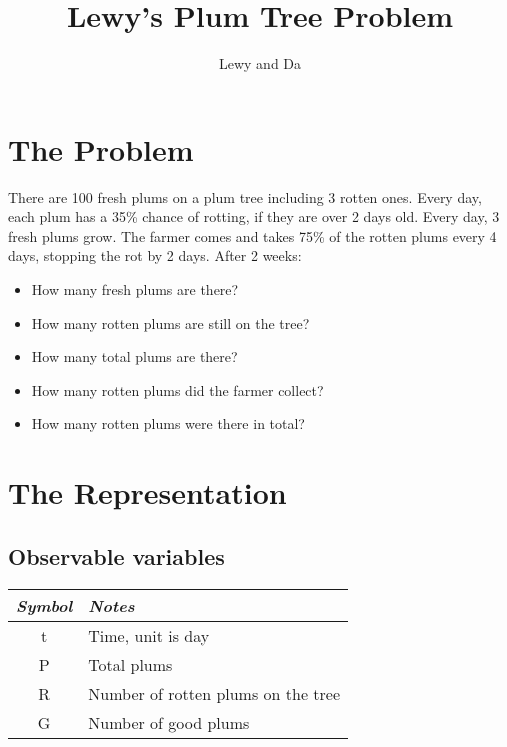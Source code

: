\documentclass[11pt, oneside]{article}   	%
\title{Lewy's Plum Tree Problem}
\author{Lewy and Da}
\begin{document}
\maketitle

\section{The Problem}
There are 100 fresh plums on a plum tree including 3 rotten ones. Every day, each plum has a 35\% chance of rotting, if they are over 2 days old. Every day, 3 fresh plums grow. The farmer comes and takes 75\% of the rotten plums every 4 days, stopping the rot by 2 days. After 2 weeks:

\begin{itemize}
\item How many fresh plums are there?
\item How many rotten plums are still on the tree?
\item How many total plums are there?
\item How many rotten plums did the farmer collect?
\item How many rotten plums were there in total?
\end{itemize}

\section{The Representation}

\subsection{Observable variables}
\begin{center}
 \begin{tabular}{| c | l |} 
 \hline
 \bf{\em{Symbol}}& \bf{\em{Notes}} \\ [0.5ex] 
 \hline\hline
 t & Time, unit is day  \\ 
 \hline
 P & Total plums  \\
 \hline
 R & Number of rotten plums on the tree  \\
 \hline
 G & Number of good plums  \\
 \hline
\end{tabular}
\end{center}
\end{document}

